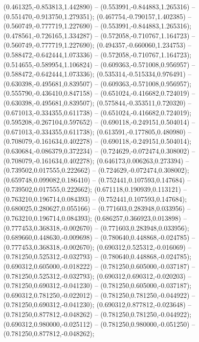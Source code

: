  (0.461325,-0.853813,1.442890) -- (0.553991,-0.844883,1.265316) -- (0.551470,-0.913750,1.279351);
 (0.467754,-0.790157,1.402385) -- (0.560749,-0.777719,1.227690) -- (0.553991,-0.844883,1.265316);
 (0.478561,-0.726165,1.334287) -- (0.572058,-0.710767,1.164723) -- (0.560749,-0.777719,1.227690);
 (0.494357,-0.660060,1.234753) -- (0.588472,-0.642444,1.073336) -- (0.572058,-0.710767,1.164723);
 (0.514655,-0.589954,1.106824) -- (0.609363,-0.571008,0.956957) -- (0.588472,-0.642444,1.073336);
 (0.535314,-0.515334,0.976491) -- (0.630398,-0.495681,0.839507) -- (0.609363,-0.571008,0.956957);
 (0.555790,-0.436410,0.847158) -- (0.651024,-0.416682,0.724019) -- (0.630398,-0.495681,0.839507);
 (0.575844,-0.353511,0.720320) -- (0.671013,-0.334355,0.611738) -- (0.651024,-0.416682,0.724019);
 (0.595208,-0.267104,0.597652) -- (0.690118,-0.249151,0.504014) -- (0.671013,-0.334355,0.611738);
 (0.613591,-0.177805,0.480980) -- (0.708079,-0.161634,0.402278) -- (0.690118,-0.249151,0.504014);
 (0.630684,-0.086379,0.372234) -- (0.724629,-0.072474,0.308002) -- (0.708079,-0.161634,0.402278);
 (0.646173,0.006263,0.273394) -- (0.739502,0.017555,0.222662) -- (0.724629,-0.072474,0.308002);
 (0.659748,0.099082,0.186410) -- (0.752441,0.107593,0.147684) -- (0.739502,0.017555,0.222662);
 (0.671118,0.190939,0.113121) -- (0.763210,0.196714,0.084393) -- (0.752441,0.107593,0.147684);
 (0.680025,0.280627,0.055166) -- (0.771603,0.283948,0.033956) -- (0.763210,0.196714,0.084393);
 (0.686257,0.366923,0.013898) -- (0.777453,0.368318,-0.002670) -- (0.771603,0.283948,0.033956);
 (0.689660,0.448630,-0.009698) -- (0.780640,0.448868,-0.024785) -- (0.777453,0.368318,-0.002670);
 (0.690312,0.525312,-0.016069) -- (0.781250,0.525312,-0.032793) -- (0.780640,0.448868,-0.024785);
 (0.690312,0.605000,-0.018222) -- (0.781250,0.605000,-0.037187) -- (0.781250,0.525312,-0.032793);
 (0.690312,0.690312,-0.020203) -- (0.781250,0.690312,-0.041230) -- (0.781250,0.605000,-0.037187);
 (0.690312,0.781250,-0.022012) -- (0.781250,0.781250,-0.044922) -- (0.781250,0.690312,-0.041230);
 (0.690312,0.877812,-0.023648) -- (0.781250,0.877812,-0.048262) -- (0.781250,0.781250,-0.044922);
 (0.690312,0.980000,-0.025112) -- (0.781250,0.980000,-0.051250) -- (0.781250,0.877812,-0.048262);
